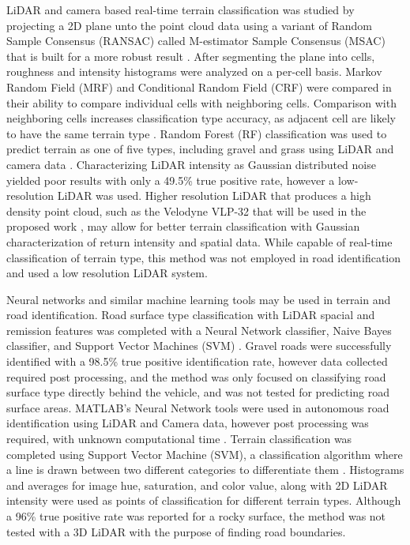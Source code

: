 \documentclass[numbered,pdftex]{ohio-etd}
\begin{document}
{{		{LiDAR and camera based real-time terrain classification was studied by projecting a 2D plane unto the point cloud data using a variant of Random Sample Consensus (RANSAC) called M-estimator Sample Consensus (MSAC) \cite{mijakovska_generating_2014} that is built for a more robust result \cite{laible_3d_2012,laible_map_building,laible_terrain_2013}. After segmenting the plane into cells, roughness and intensity histograms were analyzed on a per-cell basis. Markov Random Field (MRF) \cite{chellappa_classification_1985} and Conditional Random Field (CRF) \cite{wallach_conditional_nodate} were compared in their ability to compare individual cells with neighboring cells. Comparison with neighboring cells increases classification type accuracy, as adjacent cell are likely to have the same terrain type \cite{haselich_terrain_2011,zhao_fusion_2014}. Random Forest (RF) classification was used to predict terrain as one of five types, including gravel and grass using LiDAR and camera data \cite{breiman_random_2001}. Characterizing LiDAR intensity as Gaussian distributed noise yielded poor results with only a 49.5\% true positive rate, however a low-resolution LiDAR was used. Higher resolution LiDAR that produces a high density point cloud, such as the Velodyne VLP-32 that will be used in the proposed work \cite{vlp_32c}, may allow for better terrain classification with Gaussian characterization of return intensity and spatial data. While capable of real-time classification of terrain type, this method was not employed in road identification and used a low resolution LiDAR system.}
		
		{Neural networks and similar machine learning tools may be used in terrain and road identification. Road surface type classification with LiDAR spacial and remission features was completed with a Neural Network classifier, Naive Bayes classifier, and Support Vector Machines (SVM) \cite{wang_road_nodate,wang_two-stage_2018}. Gravel roads were successfully identified with a 98.5\% true positive identification rate, however data collected required post processing, and the method was only focused on classifying road surface type directly behind the vehicle, and was not tested for predicting road surface areas. MATLAB's Neural Network tools were used in autonomous road identification using LiDAR and Camera data, however post processing was required, with unknown computational time \cite{rasmussen_combining_2002}. Terrain classification was completed using Support Vector Machine (SVM), a classification algorithm where a line is drawn between two different categories to differentiate them \cite{wietrzykowski_boosting_2014}. Histograms and averages for image hue, saturation, and color value, along with 2D LiDAR intensity were used as points of classification for different terrain types. Although a 96\% true positive rate was reported for a rocky surface, the method was not tested with a 3D LiDAR with the purpose of finding road boundaries. }
		
}}
\end{document}
